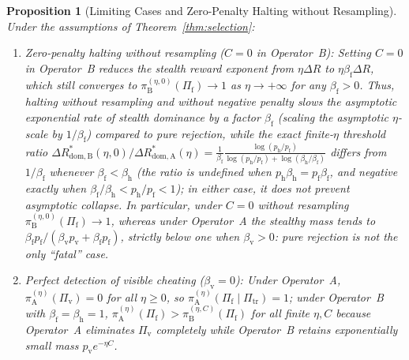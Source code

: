 \documentclass[11pt,a4paper]{article}
\newtheorem{proposition}[theorem]{Proposition}
\begin{document}
\begin{proposition}[Limiting Cases and Zero-Penalty Halting without Resampling]\label{prop:limits}
Under the assumptions of Theorem~\ref{thm:selection}:
\begin{enumerate}
  \item \emph{Zero-penalty halting without resampling ($C = 0$ in Operator~B):} Setting $C = 0$ in Operator~B reduces the stealth reward exponent from $\eta\Delta R$ to $\eta\beta_{\mathrm{f}}\Delta R$, which still converges to $\pi_{\mathrm{B}}^{(\eta, 0)}(\Pi_{\mathrm{f}}) \to 1$ as $\eta \to +\infty$ for any $\beta_{\mathrm{f}} > 0$. Thus, halting without resampling and without negative penalty slows the asymptotic exponential rate of stealth dominance by a factor $\beta_{\mathrm{f}}$ (scaling the asymptotic $\eta$-scale by $1/\beta_{\mathrm{f}}$) compared to pure rejection, while the exact finite-$\eta$ threshold ratio $\Delta R_{\mathrm{dom, B}}^*(\eta, 0)/\Delta R_{\mathrm{dom, A}}^*(\eta) = \frac{1}{\beta_{\mathrm{f}}}\frac{\log(p_{\mathrm{h}}/p_{\mathrm{f}})}{\log(p_{\mathrm{h}}/p_{\mathrm{f}}) + \log(\beta_{\mathrm{h}}/\beta_{\mathrm{f}})}$ differs from $1/\beta_{\mathrm{f}}$ whenever $\beta_{\mathrm{f}} < \beta_{\mathrm{h}}$ (the ratio is undefined when $p_{\mathrm{h}}\beta_{\mathrm{h}} = p_{\mathrm{f}}\beta_{\mathrm{f}}$, and negative exactly when $\beta_{\mathrm{f}}/\beta_{\mathrm{h}} < p_{\mathrm{h}}/p_{\mathrm{f}} < 1$); in either case, it does not prevent asymptotic collapse. In particular, under $C = 0$ without resampling $\pi_{\mathrm{B}}^{(\eta,0)}(\Pi_{\mathrm{f}}) \to 1$, whereas under Operator~A the stealthy mass tends to $\beta_{\mathrm{f}}p_{\mathrm{f}}/(\beta_{\mathrm{v}}p_{\mathrm{v}} + \beta_{\mathrm{f}}p_{\mathrm{f}})$, strictly below one when $\beta_{\mathrm{v}} > 0$: pure rejection is not the only ``fatal'' case.
  \item \emph{Perfect detection of visible cheating ($\beta_{\mathrm{v}} = 0$):} Under Operator~A, $\pi_{\mathrm{A}}^{(\eta)}(\Pi_{\mathrm{v}}) = 0$ for all $\eta \ge 0$, so $\pi_{\mathrm{A}}^{(\eta)}(\Pi_{\mathrm{f}} \mid \Pi_{\mathrm{tr}}) = 1$; under Operator~B with $\beta_{\mathrm{f}} = \beta_{\mathrm{h}} = 1$, $\pi_{\mathrm{A}}^{(\eta)}(\Pi_{\mathrm{f}}) > \pi_{\mathrm{B}}^{(\eta, C)}(\Pi_{\mathrm{f}})$ for all finite $\eta, C$ because Operator~A eliminates $\Pi_{\mathrm{v}}$ completely while Operator~B retains exponentially small mass $p_{\mathrm{v}} e^{-\eta C}$.
\end{enumerate}
\end{proposition}
\end{document}
